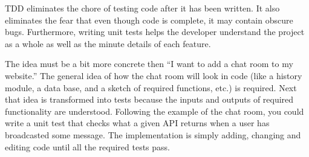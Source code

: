 TDD eliminates the chore of testing code after it has been written. It also eliminates the fear that even though code is complete, it may contain obscure bugs. Furthermore, writing unit tests helps the developer understand the project as a whole as well as the minute details of each feature.

The idea must be a bit more concrete then ``I want to add a chat room to my website.'' The general idea of how the chat room will look in code (like a history module, a data base, and a sketch of required functions, etc.) is required.
Next that idea is transformed into tests because the inputs and outputs of required functionality are understood.
Following the example of the chat room, you could write a unit test that checks what a given API returns when a user has broadcasted some message.
The implementation is simply adding, changing and editing code until all the required tests pass.

